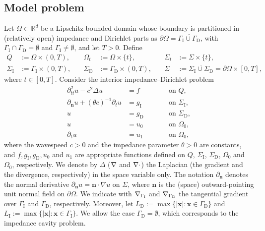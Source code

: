 \documentclass[a4paper]{article}
\theoremstyle{plain}
\theoremstyle{definition}
\newcommand{\conj}[1]{\overline{#1}}
\newcommand{\Div}[1]{\nabla \cdot #1}
\newcommand{\Grad}[1]{\nabla #1}
\newcommand{\Lap}[1]{\Delta #1}
\newcommand{\TimeDer}{{\partial^{}_t}}
\newcommand{\SecondTimeDer}{{\partial^2_{tt}}}
\newcommand{\NormDer}{{\partial_{\bm{n}}}}
\newcommand{\vect}[1]{\bm{#1}}
\newcommand{\R}{\mathbb{R}}
\newcommand{\LI}{L_{\mathrm I}}
\newcommand{\LD}{L_{\mathrm D}}
\newcommand{\GD}{{\Gamma_{\mathrm D}}}
\newcommand{\GI}{{\Gamma_{\mathrm I}}}
\newcommand{\SD}{{\Sigma_{\mathrm D}}}
\newcommand{\SI}{{\Sigma_{\mathrm I}}}
\newcommand{\gD}{{g_{\mathrm D}}}
\newcommand{\gI}{{g_{\mathrm I}}}
\newcommand{\deO}{{\partial\Omega}}
\newcommand{\vx}{{\vect x}}
\newcommand{\vn}{{\vect n}}
\newcommand{\GradGD}{{\Grad_{\GD}}}
\newcommand{\GradGI}{{\Grad_{\GI}}}
\begin{document}
\subsection{Model problem}\label{sec:IBVP}

Let $\Omega \subset \R^d$ be a Lipschitz bounded domain whose boundary is partitioned in (relatively open) impedance and Dirichlet parts as $\deO=\conj{\GI\cup\GD}$, with $\GI\cap\GD=\emptyset$ and $\GI\ne\emptyset$, and let $T>0$.
Define
\begin{align*}
	Q        & := \Omega \times (0,T), \quad            &
	\Omega_t & := \Omega \times \{t\}, \quad            &
	\Sigma_t & := \Sigma \times \{t\},        \\
	\SI      & := \GI \times (0,T), \quad               &
	\SD      & := \GD \times (0,T),\quad                &
    \Sigma   & :=\overline{\SI\cup\SD}=\deO\times[ 0,T ],
\end{align*}
where $t \in [0,T]$. Consider the interior impedance--Dirichlet problem
\begin{equation}\label{eq:IBVP}
	\begin{aligned}
\SecondTimeDer{u} -c^2 \Lap u            & = f \qquad   &  & \text{on } Q,       \\
		\NormDer u  + (\theta c)^{-1}\TimeDer{u} & = \gI \qquad &  & \text{on }\SI,      \\
		u                                        & = \gD \qquad &  & \text{on }\SD,      \\
		u                                        & = u_0        &  & \text{on }\Omega_0, \\
		\TimeDer{u}                              & = u_1        &  & \text{on }\Omega_0,
	\end{aligned}
\end{equation}
where the wavespeed $c > 0$ and the impedance parameter $\theta > 0$ are constants, and $f,\gI,\gD, u_0$ and $u_1$ are appropriate functions defined on $Q$, $\SI$, $\SD$, $\Omega_0$ and $\Omega_0$, respectively.
We denote by $\Delta$ ($\Grad$ and $\Div$) the Laplacian (the gradient and the divergence, respectively) in the space variable only.
The notation $\NormDer$ denotes the normal derivative $\NormDer u=\vn\cdot\Grad u$ on $\Sigma$, where $\vn$ is the (space) outward-pointing unit normal field on $\partial\Omega$.
We indicate with $\GradGI$ and $\GradGD$ the tangential gradient over $\GI$ and $\GD$, respectively. Moreover, let $\LD := \max\{|\vx|: \vx\in\GD\}$ and $\LI := \max\{|\vx|: \vx\in\GI\}$.
We allow the case $\GD=\emptyset$, which corresponds to the impedance cavity problem.
\end{document}
